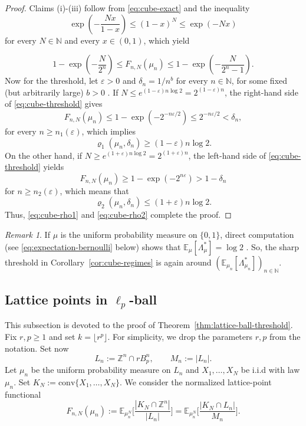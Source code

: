 \documentclass[11pt,a4paper]{article} %
\theoremstyle{definition}
\theoremstyle{remark}
\newtheorem{remark}[theorem]{Remark}
\newcommand{\E}{\mathbb{E}}
\newcommand{\Z}{\mathbb{Z}}
\newcommand{\conv}{\mathrm{conv}}
\newcommand{\1}{\mathds{1}}
\begin{document}
\begin{proof} Claims {\rm (i)-(iii)} follow from \eqref{eq:cube-exact} and the inequality 
    $$\exp\left(-\frac{Nx}{1-x}\right) \leq (1-x)^N \leq \exp(-Nx)
$$ for every $N \in \mathbb{N}$ and every $x \in (0,1)$, which yield

\begin{equation}\label{eq:cube-threshold}
    1-\exp\left(-\frac{N}{2^n}\right) \leq F_{n,N}(\mu_n) \leq 1-\exp\left(-\frac{N}{2^n-1}\right).
\end{equation}
    Now for the threshold, let $\varepsilon>0$ and $\delta_n=1/n^b$ for every $n \in \mathbb{N}$, for some fixed (but arbitrarily large) $b>0$ . If $N \leq e^{(1-\varepsilon)n\log 2}=2^{(1-\varepsilon)n}$, the right-hand side of \eqref{eq:cube-threshold} gives $$F_{n,N}(\mu_n) \leq 1-\exp\left(-2^{-n \varepsilon/2}\right) \leq 2^{-n\varepsilon/2}< \delta_n ,$$ for every $n \geq n_1(\varepsilon)$, which implies \begin{equation}\label{eq:cube-rho1}
        \varrho_1(\mu_n,\delta_n) \geq (1-\varepsilon)n \log 2.
    \end{equation} On the other hand,   if  $N \geq e^{(1+\varepsilon)n\log 2}=2^{(1+\varepsilon)n}$, the left-hand side of \eqref{eq:cube-threshold} yields $$F_{n,N}(\mu_n) \geq 1-\exp\left(-2^{n\varepsilon}\right)> 1-\delta_n$$ for $n \geq n_2(\varepsilon)$, which means that \begin{equation}\label{eq:cube-rho2}      
    \varrho_2(\mu_n,\delta_n) \leq (1+\varepsilon)n\log 2. \end{equation}
    Thus, \eqref{eq:cube-rho1} and \eqref{eq:cube-rho2} complete the proof.
\end{proof}

  \begin{remark}
    If $\mu$ is the uniform probability measure on $\{0,1\}$, direct computation (see \eqref{eq:expectation-bernoulli} below) shows that $\mathbb{E}_{\mu}[\Lambda_\mu^\ast]=\log 2$ . So, the sharp threshold in Corollary~\ref{cor:cube-regimes} is again around $(\mathbb{E}_{\mu_n}[\Lambda_{\mu_n}^\ast])_{n \in \mathbb{N}}$.
\end{remark}  


\subsection{Lattice points in $\ell_p$-ball}


This subsection is devoted to the proof of Theorem~\ref{thm:lattice-ball-threshold}.
Fix $r,p \geq 1$ and set $k=\lfloor r^p \rfloor$. For simplicity, we drop the parameters $r,p$ from the notation. Set now
\[
L_n:=\Z ^n\cap rB_p^n,\qquad M_n:=|L_n|.
\]
Let $\mu_n$ be the uniform probability measure on $L_n$ and $X_1,\dots,X_N$ be i.i.d with law $\mu_n$. Set  $K_N:=\conv\{X_1,\dots,X_N\}$.
We consider the normalized lattice-point functional
\[
F_{n,N}(\mu_n):=\E_{\mu_n^N}\Big[\frac{|K_N\cap\Z^n|}{|L_n|}\Big]
=\E_{\mu_n^N}\Big[\frac{|K_N\cap L_n|}{M_n}\Big].
\]
\end{document}
